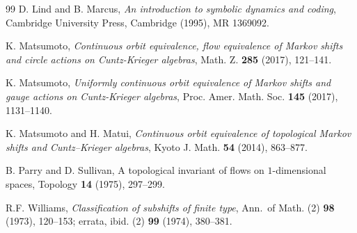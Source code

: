 \documentclass[12pt,a4paper,oneside,reqno,final]{amsart}
\theoremstyle{definition}
\numberwithin{equation}{section} %
\begin{document}
\begin{thebibliography}{99}
     D. Lind and B. Marcus,
        \emph{An introduction to symbolic dynamics and coding},
        Cambridge University Press, Cambridge (1995), MR 1369092.

     K. Matsumoto,
        \emph{Continuous orbit equivalence, flow equivalence of Markov shifts and circle actions on Cuntz-Krieger algebras},
        Math. Z. \textbf{285} (2017), 121–141.

     K. Matsumoto,
        \emph{Uniformly continuous orbit equivalence of {M}arkov shifts and gauge actions on {C}untz-{K}rieger algebras},
        Proc. Amer. Math. Soc. \textbf{145} (2017), 1131--1140.

     K. Matsumoto and H. Matui,
        \emph{Continuous orbit equivalence of topological Markov shifts and Cuntz--Krieger algebras},
        Kyoto J. Math. \textbf{54} (2014), 863--877.

     B. Parry and D. Sullivan,
        A topological invariant of flows on {$1$}-dimensional spaces,
        Topology \textbf{14} (1975), 297--299.

     R.F. Williams,
        \emph{Classification of subshifts of finite type},
        Ann.\ of Math. (2) \textbf{98} (1973), 120--153; errata, ibid. (2) \textbf{99} (1974), 380--381.
    \end{thebibliography}
\end{document}

